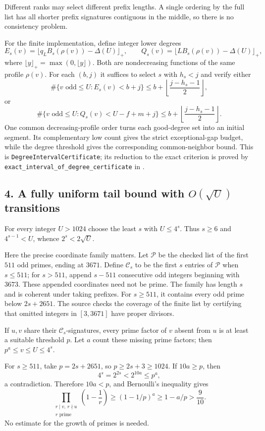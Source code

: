 Different ranks may select different prefix lengths. A single ordering by the full list has all shorter prefix signatures contiguous in the middle, so there is no consistency problem.

For the finite implementation, define integer lower degrees
\[
 E_s(v)=\lfloor q_LB_s(\rho(v))-\Delta(U)\rfloor_+,
 \qquad
 Q_s(v)=\lfloor LB_s(\rho(v))-\Delta(U)\rfloor_+,
\]
where $\lfloor y\rfloor_+=\max(0,\lfloor y\rfloor)$. Both are nondecreasing functions of the same profile $\rho(v)$. For each $(b,j)$ it suffices to select $s$ with $h_s<j$ and verify either
\[
 \#\{v\text{ odd}\le U:E_s(v)<b+j\}
 \le b+\left\lfloor\frac{j-h_s-1}{2}\right\rfloor,
\]
or
\[
 \#\{v\text{ odd}\le U:Q_s(v)<U-f+m+j\}
 \le b+\left\lfloor\frac{j-h_s-1}{2}\right\rfloor.
\]
One common decreasing-profile order turns each good-degree set into an initial segment. Its complementary low count gives the strict exceptional-gap budget, while the degree threshold gives the corresponding common-neighbor bound. This is \texttt{DegreeIntervalCertificate}; its reduction to the exact criterion is proved by \texttt{exact\_interval\_of\_degree\_certificate} in .

\subsection*{4. A fully uniform tail bound with $O(\sqrt U)$ transitions}
For every integer $U>1024$ choose the least $s$ with $U\le4^s$. Thus $s\ge6$ and $4^{s-1}<U$, whence $2^s<2\sqrt U$.

Here the precise coordinate family matters. Let $\mathcal P$ be the checked list of the first $511$ odd primes, ending at $3671$. Define $\mathcal C_s$ to be the first $s$ entries of $\mathcal P$ when $s\le511$; for $s>511$, append $s-511$ consecutive odd integers beginning with $3673$. These appended coordinates need not be prime. The family has length $s$ and is coherent under taking prefixes. For $s\ge511$, it contains every odd prime below $2s+2651$. The source checks the coverage of the finite list by certifying that omitted integers in $[3,3671]$ have proper divisors.

If $u,v$ share their $\mathcal C_s$-signatures, every prime factor of $v$ absent from $u$ is at least a suitable threshold $p$. Let $a$ count these missing prime factors; then $p^a\le v\le U\le4^s$.

For $s\ge511$, take $p=2s+2651$, so $p\ge2s+3\ge1024$. If $10a\ge p$, then
\[
 4^s=2^{2s}<2^{10a}\le p^a,
\]
a contradiction. Therefore $10a<p$, and Bernoulli's inequality gives
\[
 \prod_{\substack{r\mid v,\ r\nmid u\\r\text{ prime}}}\left(1-\frac1r\right)
 \ge(1-1/p)^a\ge1-a/p>\frac9{10}.
\]
No estimate for the growth of primes is needed.

